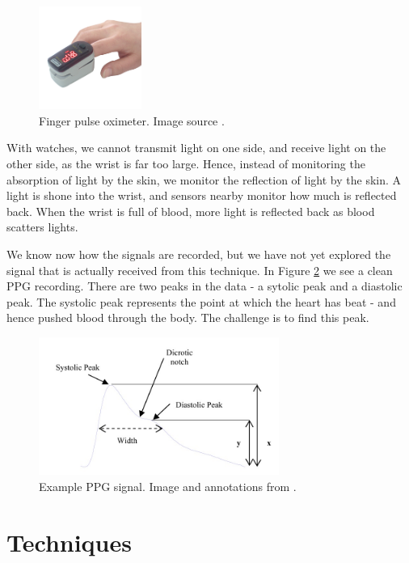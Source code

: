 \documentclass[12pt,a4paper,twoside,openright]{report}
\begin{document}
\begin{figure}[h!]
	\centerline{\includegraphics[width=0.3\textwidth]{figs/fingerppg.jpg}}
	\caption{Finger pulse oximeter. Image source \cite{wiki:fingerppg}.}
\label{fig:fingerppg}
\end{figure}

With watches, we cannot transmit light on one side, and
receive light on the other side, as the wrist is far too large. Hence, instead
of monitoring the absorption of light by the skin, we monitor the reflection
of light by the skin. A light is shone into the wrist, and sensors nearby
monitor how much is reflected back. When the wrist is full of blood, more
light is reflected back as blood scatters lights.

We know now how the signals are recorded, but we have not yet explored the
signal that is actually received from this technique. In Figure
\ref{fig:typicalppgsignal} we see a
clean PPG recording. There are two peaks in the data - a sytolic peak and a
diastolic peak. The systolic peak represents the point at which the heart has
beat - and hence pushed blood through the body. The challenge is to find this
peak.

\begin{figure}[h!]
	\centerline{\includegraphics[width=0.7\textwidth]{figs/typicalppgsignal.jpeg}}
	\caption{Example PPG signal. Image and annotations from \cite{elgendi12}.}
\label{fig:typicalppgsignal}
\end{figure}

\section{Techniques}
\end{document}
